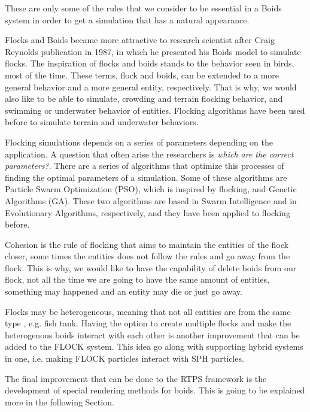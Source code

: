 These are only some of the rules that we consider to be essential in a Boids system in order to get a simulation that has a natural appearance.

Flocks and Boids became more attractive to research scientist after Craig Reynolds publication in 1987\cite{craig1}, in which he presented his Boids model to simulate flocks. The inspiration of flocks and boids stands to the behavior seen in birds, most of the time. These terms, flock and boids, can be extended to a more general behavior and a more general entity, respectively. That is why, we would also like to be able to simulate, crowding and terrain flocking behavior, and swimming or underwater behavior of entities. Flocking algorithms have been used before to simulate terrain and underwater behaviors\cite{supermassiveCrowd}. 

Flocking simulations depends on a series of parameters depending on the application. A question that often arise the researchers is \textit{which are the correct parameters?}. There are a series of algorithms that optimize this processes of finding the optimal parameters of a simulation. Some of these algorithms are Particle Swarm Optimization (PSO), which is inspired by flocking, and Genetic Algorithms (GA). These two algorithms are based in Swarm Intelligence and in Evolutionary Algorithms, respectively, and they have been applied to flocking before\cite{TODO:needReference}.

Cohesion is the rule of flocking that aims to maintain the entities of the flock closer, some times the entities does not follow the rules and go away from the flock. This is why, we would like to have the capability of delete boids from our flock, not all the time we are going to have the same amount of entities, something may happened and an entity may die or just go away. 

Flocks may be heterogeneous, meaning that not all entities are from the same type , e.g. fish tank. Having the option to create multiple flocks and make the heterogenous boids interact with each other is another improvement that can be added to the FLOCK system. This idea go along with supporting hybrid systems in one, i.e. making FLOCK particles interact with SPH particles.

The final improvement that can be done to the RTPS framework is the development of special rendering methods for boids. This is going to be explained more in the following Section.

